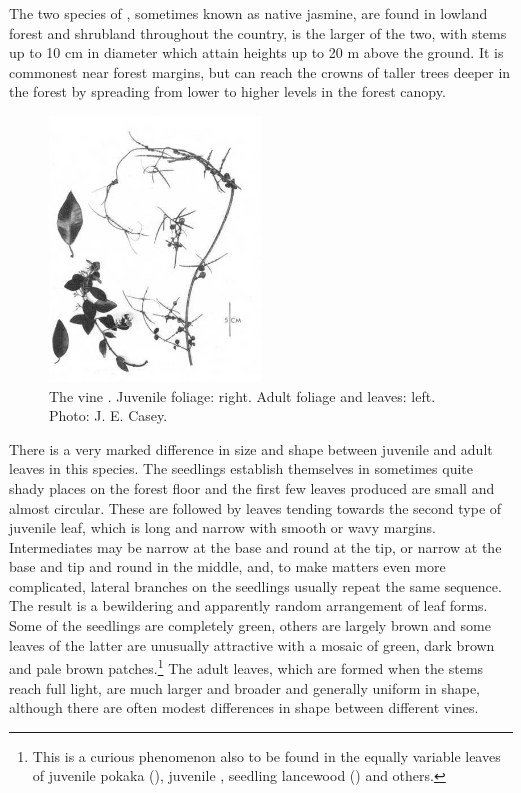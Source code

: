 The two species of , sometimes known as native jasmine, are found in lowland forest and shrubland throughout the country,  is the larger of the two, with stems up to 10 cm in diameter which attain heights up to 20 m above the ground.
It is commonest near forest margins, but can reach the crowns of taller trees deeper in the forest by spreading from lower to higher levels in the forest canopy.

\begin{figure}
	\includegraphics[width=0.5\textwidth]{graphics/figure34parsonsia.jpg}
	\centering
	\caption[The vine ]{The vine . Juvenile foliage: right. Adult foliage and leaves: left. Photo: J. E. Casey.}
	\label{fig:34parsonsia}
\end{figure}

There is a very marked difference in size and shape between juvenile and adult leaves in this species.
The seedlings establish themselves in sometimes quite shady places on the forest floor and the first few leaves produced are small and almost circular.
These are followed by leaves tending towards the second type of juvenile leaf, which is long and narrow with smooth or wavy margins.
Intermediates may be narrow at the base and round at the tip, or narrow at the base and tip and round in the middle, and, to make matters even more complicated, lateral branches on the seedlings usually repeat the same sequence.
The result is a bewildering and apparently random arrangement of leaf forms.
Some of the seedlings are completely green, others are largely brown and some leaves of the latter are unusually attractive with a mosaic of green, dark brown and pale brown patches.\footnote{This is a curious phenomenon also to be found in the equally variable leaves of juvenile pokaka (), juvenile , seedling lancewood () and others.}
The adult leaves, which are formed when the stems reach full light, are much larger and broader and generally uniform in shape, although there are often modest differences in shape between different vines.

